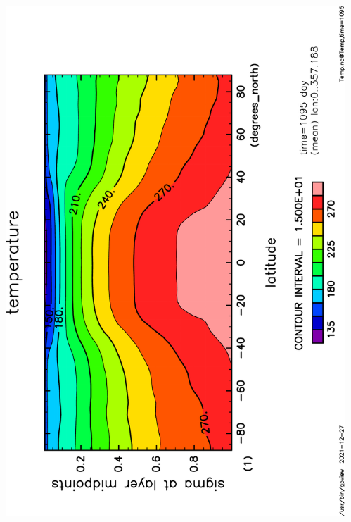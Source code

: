 \documentclass[aspectratio=149,9pt,fleqn]{beamer}
\begin{document}
\begin{frame}
\begin{columns}[T]
\begin{column}{.4\textwidth}
		\end{column}
		\begin{column}{.4\textwidth}
			\includegraphics[height=\textwidth,angle=-90]{S1500Temp,time=1095-crop.pdf}
		\end{column}
	\end{columns}
\end{frame}
\end{document}
